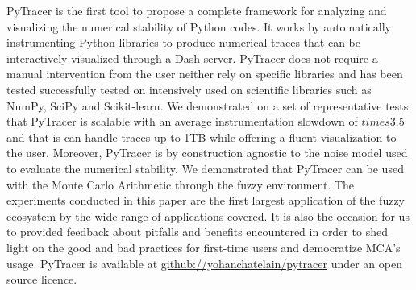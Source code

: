 \documentclass[11pt]{article}
\newcommand{\pytracer}[0]{PyTracer\xspace}
\begin{document}
\pytracer is the first tool to propose a complete framework
for analyzing and visualizing the numerical stability of Python codes.
It works by automatically instrumenting Python libraries to produce numerical
traces that can be interactively visualized through a Dash server.
\pytracer does not require a manual intervention from the user neither rely on
specific libraries and has been tested successfully tested on 
intensively used on scientific libraries such as NumPy, SciPy and Scikit-learn. We demonstrated on a set of representative tests that \pytracer is scalable with an average instrumentation slowdown of $times 3.5$ and that is can handle traces up to 1TB while offering a fluent visualization to the user. Moreover,
\pytracer is by construction agnostic to the noise model used 
to evaluate the numerical stability. We demonstrated 
that \pytracer can be used with the Monte Carlo Arithmetic 
through the fuzzy environment. 
The experiments conducted in this paper are the first largest application of the fuzzy ecosystem by the wide range of applications covered. It is also the occasion for us to
provided  feedback 
about pitfalls and benefits encountered
in order to shed light on the good and bad practices for first-time users and democratize MCA's usage.
\pytracer is available at \href{https://github.com/yohanchatelain/pytracer}{github://yohanchatelain/pytracer} under an open source licence.




\end{document}
